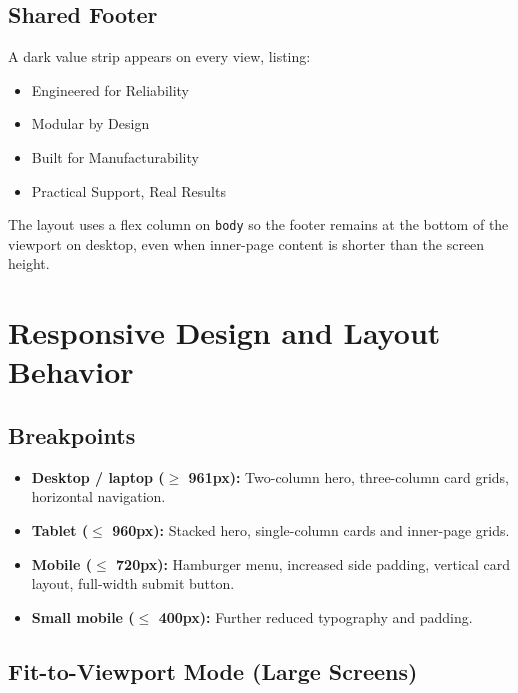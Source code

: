 \documentclass[11pt,a4paper]{article}
\begin{document}
\subsection{Shared Footer}

A dark value strip appears on every view, listing:

\begin{itemize}[noitemsep]
  \item Engineered for Reliability
  \item Modular by Design
  \item Built for Manufacturability
  \item Practical Support, Real Results
\end{itemize}

The layout uses a flex column on \texttt{body} so the footer remains at the
bottom of the viewport on desktop, even when inner-page content is shorter
than the screen height.

\section{Responsive Design and Layout Behavior}

\subsection{Breakpoints}

\begin{itemize}[noitemsep]
  \item \textbf{Desktop / laptop ($\geq$ 961px):} Two-column hero, three-column
        card grids, horizontal navigation.
  \item \textbf{Tablet ($\leq$ 960px):} Stacked hero, single-column cards and
        inner-page grids.
  \item \textbf{Mobile ($\leq$ 720px):} Hamburger menu, increased side padding,
        vertical card layout, full-width submit button.
  \item \textbf{Small mobile ($\leq$ 400px):} Further reduced typography and
        padding.
\end{itemize}

\subsection{Fit-to-Viewport Mode (Large Screens)}
\end{document}
